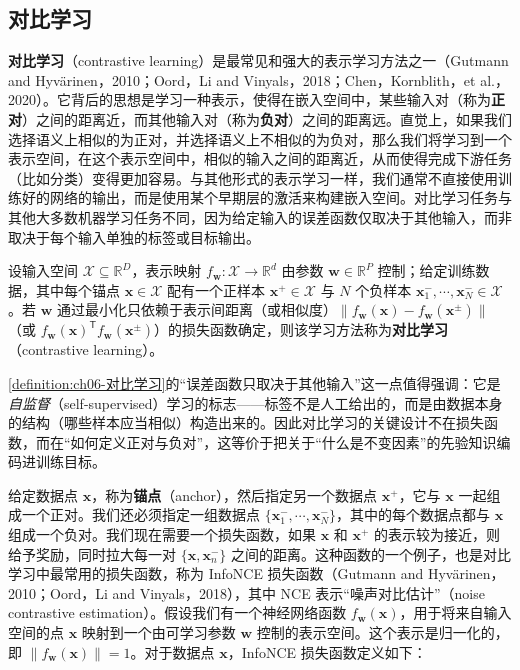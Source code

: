 \documentclass[../../main.tex]{subfiles}
\begin{document}
\subsection{对比学习}\label{subsection:ch06-对比学习}

\textbf{对比学习}（contrastive learning）是最常见和强大的表示学习方法之一（Gutmann and Hyvärinen，2010；Oord，Li and Vinyals，2018；Chen，Kornblith，et al.，2020）。它背后的思想是学习一种表示，使得在嵌入空间中，某些输入对（称为\textbf{正对}）之间的距离近，而其他输入对（称为\textbf{负对}）之间的距离远。直觉上，如果我们选择语义上相似的为正对，并选择语义上不相似的为负对，那么我们将学习到一个表示空间，在这个表示空间中，相似的输入之间的距离近，从而使得完成下游任务（比如分类）变得更加容易。与其他形式的表示学习一样，我们通常不直接使用训练好的网络的输出，而是使用某个早期层的激活来构建嵌入空间。对比学习任务与其他大多数机器学习任务不同，因为给定输入的误差函数仅取决于其他输入，而非取决于每个输入单独的标签或目标输出。

\begin{definition}[对比学习]\label{definition:ch06-对比学习}
设输入空间 $\mathcal{X}\subseteq\mathbb{R}^{D}$，表示映射 $f_{\boldsymbol{w}}:\mathcal{X}\to\mathbb{R}^{d}$ 由参数 $\boldsymbol{w}\in\mathbb{R}^{P}$ 控制；给定训练数据，其中每个锚点 $\boldsymbol{x}\in\mathcal{X}$ 配有一个正样本 $\boldsymbol{x}^{+}\in\mathcal{X}$ 与 $N$ 个负样本 $\boldsymbol{x}_{1}^{-},\cdots,\boldsymbol{x}_{N}^{-}\in\mathcal{X}$。若 $\boldsymbol{w}$ 通过最小化只依赖于表示间距离（或相似度）$\|f_{\boldsymbol{w}}(\boldsymbol{x})-f_{\boldsymbol{w}}(\boldsymbol{x}^{\pm})\|$（或 $f_{\boldsymbol{w}}(\boldsymbol{x})^{\mathsf T}f_{\boldsymbol{w}}(\boldsymbol{x}^{\pm})$）的损失函数确定，则该学习方法称为\textbf{对比学习}（contrastive learning）。
\end{definition}

\begin{remark}\cref{definition:ch06-对比学习}的“误差函数只取决于其他输入”这一点值得强调：它是\emph{自监督}（self-supervised）学习的标志——标签不是人工给出的，而是由数据本身的结构（哪些样本应当相似）构造出来的。因此对比学习的关键设计不在损失函数，而在“如何定义正对与负对”，这等价于把关于“什么是不变因素”的先验知识编码进训练目标。
\end{remark}

给定数据点 $\boldsymbol{x}$，称为\textbf{锚点}（anchor），然后指定另一个数据点 $\boldsymbol{x}^{+}$，它与 $\boldsymbol{x}$ 一起组成一个正对。我们还必须指定一组数据点 $\{\boldsymbol{x}_1^{-},\cdots,\boldsymbol{x}_N^{-}\}$，其中的每个数据点都与 $\boldsymbol{x}$ 组成一个负对。我们现在需要一个损失函数，如果 $\boldsymbol{x}$ 和 $\boldsymbol{x}^{+}$ 的表示较为接近，则给予奖励，同时拉大每一对 $\{\boldsymbol{x},\boldsymbol{x}_n^{-}\}$ 之间的距离。这种函数的一个例子，也是对比学习中最常用的损失函数，称为 InfoNCE 损失函数（Gutmann and Hyvärinen，2010；Oord，Li and Vinyals，2018），其中 NCE 表示“噪声对比估计”（noise contrastive estimation）。假设我们有一个神经网络函数 $f_{\boldsymbol{w}}(\boldsymbol{x})$，用于将来自输入空间的点 $\boldsymbol{x}$ 映射到一个由可学习参数 $\boldsymbol{w}$ 控制的表示空间。这个表示是归一化的，即 $\|f_{\boldsymbol{w}}(\boldsymbol{x})\|=1$。对于数据点 $\boldsymbol{x}$，InfoNCE 损失函数定义如下：
\end{document}
